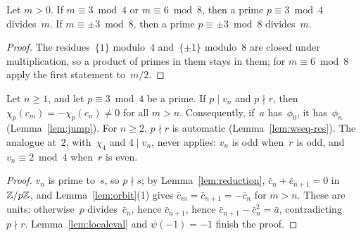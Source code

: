 \begin{lemma}
  \label{lem:prime3}
  \leanok
  Let $m > 0$. If $m \equiv 3 \bmod 4$ or $m \equiv 6 \bmod 8$, then a prime $p \equiv 3 \bmod 4$
  divides~$m$. If $m \equiv \pm 3 \bmod 8$, then a prime $p \equiv \pm 3 \bmod 8$ divides~$m$.
\end{lemma}
\begin{proof}
  \leanok
  The residues~$\{1\}$ modulo~$4$ and~$\{\pm 1\}$ modulo~$8$ are closed under multiplication, so
  a product of primes in them stays in them; for $m \equiv 6 \bmod 8$ apply the first statement
  to~$m/2$.
\end{proof}

\begin{lemma}[Reflection]
  \label{lem:reflection}
  \leanok
  Let $n \ge 1$, and let $p \equiv 3 \bmod 4$ be a prime. If $p \mid v_n$ and $p \nmid r$, then
  $\chi_p(c_m) = -\chi_p(c_n) \ne 0$ for all $m > n$. Consequently, if~$a$ has~$\phi_0$, it
  has~$\phi_n$ (Lemma~\ref{lem:jump}). For $n \ge 2$, $p \nmid r$ is automatic
  (Lemma~\ref{lem:wseq-res}). The analogue at~$2$, with~$\chi_4$ and $4 \mid v_n$, never applies:
  $v_n$ is odd when~$r$ is odd, and $v_n \equiv 2 \bmod 4$ when~$r$ is even.
\end{lemma}
\begin{proof}
  \leanok
  $v_n$ is prime to~$s$, so $p \nmid s$; by Lemma~\ref{lem:reduction},
  $\bar c_n + \bar c_{n+1} = 0$ in~$\mathbb{Z}/p\mathbb{Z}$, and Lemma~\ref{lem:orbit}(1) gives
  $\bar c_m = \bar c_{n+1} = -\bar c_n$ for $m > n$. These are units: otherwise~$p$
  divides~$\bar c_n$, hence $\bar c_{n+1}$, hence $\bar c_{n+1} - \bar c_n^2 = \bar a$,
  contradicting $p \nmid r$. Lemma~\ref{lem:localeval} and $\psi(-1) = -1$ finish the proof.
\end{proof}

